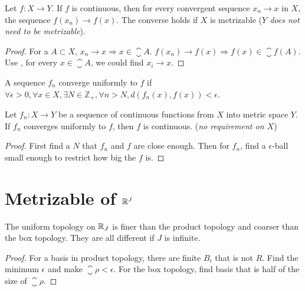 \begin{theorem}
    Let $f: X \rightarrow Y$. If $f$ is continuous, then for every convergent sequence $x_n \rightarrow x$ in $X$, the sequence $f(x_n) \rightarrow f(x)$. The converse holds if $X$ is metrizable (\emph{$Y$ does not need to be metrizable}).
\end{theorem}
\begin{proof}
    For a $A \subset X$,  $x_n \rightarrow x \Rightarrow x \in \closure{A}$. $f(x_n) \rightarrow f(x) \Rightarrow f(x) \in \closure{f(A)}$. Use , for every $x \in \closure{A}$, we could find $x_i \rightarrow x$.
\end{proof}




\begin{definition}\label{converge_uniformly}
    A sequence $f_n$ converge uniformly to $f$ if $\forall \epsilon > 0,\forall x \in X, \exists N \in \mathbb{Z}_{+}, \forall n > N, d \left( f_n (x) , f(x) \right) < \epsilon$.
\end{definition}

\begin{theorem}
    Let $f_n: X \rightarrow Y$ be a sequence of continuous functions from $X$ into metric space $Y$. If $f_n$ converges uniformly to $f$, then $f$ is continuous. (\emph{no requirement on $X$})
\end{theorem}
\begin{proof}
    First find a $N$ that $f_n$ and $f$ are close enough. Then for $f_n$, find a $\epsilon$-ball small enough to restrict how big the $f$ is.
\end{proof}






\section{Metrizable of $\mathbb{R}^J$}


\begin{theorem}
The uniform topology on $\mathbb{R}_{J}$ is finer than the product topology and coarser than the box topology. They are all different if $J$ is infinite.
\end{theorem}
\begin{proof}
    For a basis in product topology, there are finite $B_i$ that is not $R$. Find the minimum $\epsilon$ and make $\closure{\rho} < \epsilon$. For the box topology, find basis that is half of the size of $\closure{\rho}$.
\end{proof}




